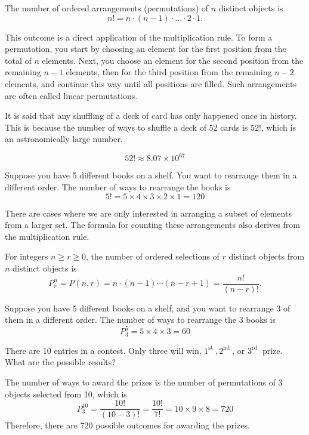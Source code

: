 \begin{proposition}
    The number of ordered arrangements (permutations) of $n$ distinct objects is
    \[
    n! = n \cdot (n-1) \cdot \dots \cdot 2 \cdot 1.
    \]
\end{proposition}

This outcome is a direct application of the multiplication rule. To form a permutation, you start by choosing an element for the first position from the total of $n$ elements. Next, you choose an element for the second position from the remaining $n-1$ elements, then for the third position from the remaining $n-2$ elements, and continue this way until all positions are filled. Such arrangements are often called linear permutations.

\begin{example}
    It is said that any shuffling of a deck of card has only happened once in history. This is because the number of ways to shuffle a deck of 52 cards is \(52!\), which is an astronomically large number.

    \[52! \approx 8.07 \times 10^{67}\]
\end{example}

\begin{example}
    Suppose you have 5 different books on a shelf. You want to rearrange them in a different order. The number of ways to rearrange the books is
    \[5! = 5 \times 4 \times 3 \times 2 \times 1 = 120\]
\end{example}

There are cases where we are only interested in arranging a subset of elements from a larger set. The formula for counting these arrangements also derives from the multiplication rule.

\begin{theorem}
    For integers $n \ge r \ge 0$, the number of ordered selections of $r$ distinct objects from $n$ distinct objects is
    \[
    P_r^n = P(n,r) = n \cdot (n-1) \cdots (n-r+1) = \frac{n!}{(n-r)!}.
    \]
\end{theorem}

\begin{example}
    Suppose you have 5 different books on a shelf, and you want to rearrange 3 of them in a different order. The number of ways to rearrange the 3 books is
    \[
    P_3^5=5 \times 4 \times 3 = 60
    \]
\end{example}

\begin{example}
    There are 10 entries in a contest. Only three will win, $1^{\text {st }}, 2^{\text {nd }}$, or $3^{\text {rd }}$ prize. What are the possible results?
\end{example}
\begin{solution}
    The number of ways to award the prizes is the number of permutations of 3 objects selected from 10, which is
    \[
    P_3^{10}= \frac{10!}{(10-3)!}=\frac{10!}{7!} = 10 \times 9 \times 8 = 720
    \]
    Therefore, there are 720 possible outcomes for awarding the prizes.
\end{solution}

